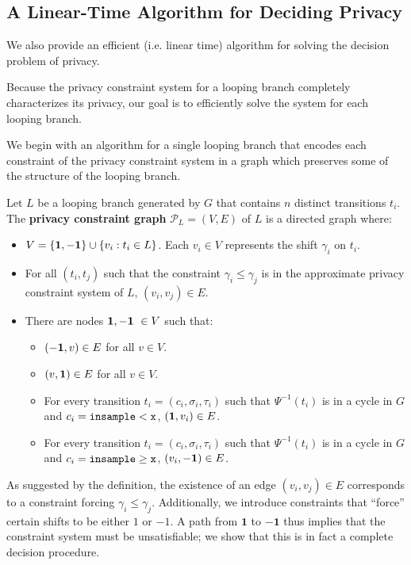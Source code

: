 
\subsection{A Linear-Time Algorithm for Deciding Privacy}\label{decisionSection}

We also provide an efficient (i.e. linear time) algorithm for solving the decision problem of privacy.

Because the privacy constraint system for a looping branch completely characterizes its privacy, our goal is to efficiently solve the system for each looping branch.

We begin with an algorithm for a single looping branch that encodes each constraint of the privacy constraint system in a graph which preserves some of the structure of the looping branch. 

\begin{defn}
    Let $L$ be a looping branch generated by $G$ that contains $n$ distinct transitions $t_i$. The \textbf{privacy constraint graph} $\mathcal{P}_L = (V, E)$ of $L$ is a directed graph where: 
    \begin{itemize}
        \item $V = \{{\bf 1, -1}\} \cup \{v_i: t_i\in L\}$. Each $v_i \in V$ represents the shift $\gamma_i$ on $t_i$.
        \item For all $(t_i, t_j)$ such that the constraint $\gamma_i \leq \gamma_j$ is in the approximate privacy constraint system of $L$, $(v_i, v_j) \in E$.
        \item There are nodes ${\bf 1, -1}\ \in V$ such that: 
        \begin{itemize}
            \item $({\bf -1}, v)\in E$ for all $v \in V$.
            \item $(v, {\bf 1})\in E$ for all $v \in V$.
            \item For every transition $t_i = (c_i, \sigma_i, \tau_i)$ such that $\Psi^{-1}(t_i)$ is in a cycle in $G$ and $c_i = \lguard[\texttt{x}]$, $({\bf 1}, v_i) \in E$.
            \item For every transition $t_i = (c_i, \sigma_i, \tau_i)$ such that $\Psi^{-1}(t_i)$ is in a cycle in $G$ and $c_i = \gguard[\texttt{x}]$, $(v_i, {\bf -1}) \in E$. 
        \end{itemize}
    \end{itemize}
\end{defn}

As suggested by the definition, the existence of an edge $(v_i, v_j)\in E$ corresponds to a constraint forcing $\gamma_i \leq \gamma_j$. Additionally, we introduce constraints that ``force'' certain shifts to be either $1$ or $-1$. 
A path from $\mathbf{1}$ to $\mathbf{-1}$ thus implies that the constraint system must be unsatisfiable; we show that this is in fact a complete decision procedure.

